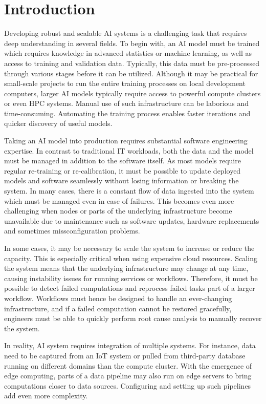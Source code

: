 \documentclass{article}
\begin{document}

\section{Introduction}
Developing robust and scalable AI systems is a challenging task that requires deep understanding in several fields. To begin with, an AI model must be trained which requires knowledge in advanced statistics or machine learning, as well as access to training and validation data. Typically, this data must be pre-processed through various stages before it can be utilized. Although it may be practical for small-scale projects to run the entire training processes on local development computers, larger AI models typically require access to powerful compute clusters or even HPC systems. Manual use of such infrastructure can be laborious and time-consuming. Automating the training process enables faster iterations and quicker discovery of useful models.

Taking an AI model into production requires substantial software engineering expertise. In contrast to traditional IT workloads, both the data and the model must be managed in addition to the software itself. As most models require regular re-training or re-calibration, it must be possible to update deployed models and software seamlessly without losing information or breaking the system. In many cases, there is a constant flow of data ingested into the system which must be managed even in case of failures. This becomes even more challenging when nodes or parts of the underlying infrastructure become unavailable due to maintenance such as software updates, hardware replacements and sometimes missconfiguration problems.

In some cases, it may be necessary to scale the system to increase or reduce the capacity. This is especially critical when using expensive cloud resources. Scaling the system means that the underlying infrastructure may change at any time, causing instability issues for running services or workflows. Therefore, it must be possible to detect failed computations and reprocess failed tasks part of a larger workflow. Workflows must hence be designed to handle an ever-changing infrastructure, and if a failed computation cannot be restored gracefully, engineers must be able to quickly perform root cause analysis to manually recover the system.

In reality, AI system requires integration of multiple systems. For instance, data need to be captured from an IoT system or pulled from third-party database running on different domains than the compute cluster. With the emergence of edge computing, parts of a data pipeline may also run on edge servers to bring computations closer to data sources. Configuring and setting up such pipelines add even more complexity. 
\end{document}
